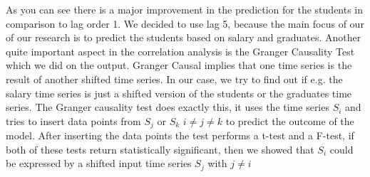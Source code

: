 \documentclass{article}
\theoremstyle{plain}
\theoremstyle{definition}
\theoremstyle{remark}
\begin{document}
As you can see there is a major improvement in the prediction for the students in comparison to lag order 1. We decided to use lag 5, because the main focus of our 
of our research is to predict the students based on salary and graduates.
Another quite important aspect in the correlation analysis is the Granger Causality Test which we did on the output. 
Granger Causal implies that one time series is the result of another shifted time series.
In our case, we try to find out if e.g. the salary time series is just a shifted version of the students or the graduates time series.
The Granger causality test does exactly this, it uses the time series $S_i$ and tries to insert data points from $S_j$ or $S_k$ $i \neq j\neq k$
to predict the outcome of the model. After inserting the data points the test performs a t-test and a F-test, if both of these tests return statistically significant,
then we showed that $S_i$ could be expressed by a shifted input time series $S_j$ with $j\neq i$






% 
\end{document}
